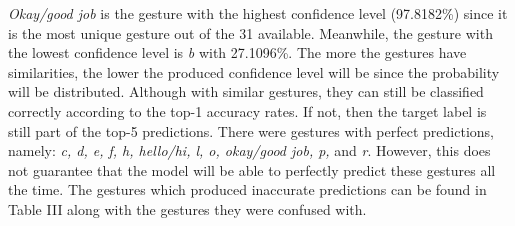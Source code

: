 \documentclass[journal]{./IEEE/IEEEtran}
\begin{document}
\indent \textit{Okay/good job} is the gesture with the highest confidence level (97.8182\%) since it is the most unique gesture out of the 31 available. Meanwhile, the gesture with the lowest confidence level is \textit{b} with 27.1096\%. The more the gestures have similarities, the lower the produced confidence level will be since the probability will be distributed. Although with similar gestures, they can still be classified correctly according to the top-1 accuracy rates. If not, then the target label is still part of the top-5 predictions.
\newline
\indent There were gestures with perfect predictions, namely: \textit{c, d, e, f, h, hello/hi, l, o, okay/good job, p,} and \textit{r}. However, this does not guarantee that the model will be able to perfectly predict these gestures all the time. The gestures which produced inaccurate predictions can be found in Table III along with the gestures they were confused with.
\end{document}
